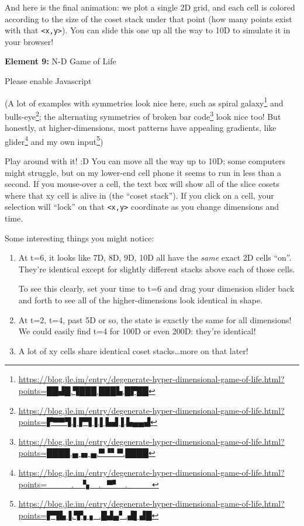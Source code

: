\documentclass[]{article}
\renewcommand{\href}[2]{#2\footnote{\url{#1}}}
\begin{document}
And here is the final animation: we plot a single 2D grid, and each cell is
colored according to the size of the coset stack under that point (how many
points exist with that \texttt{\textless{}x,y\textgreater{}}). You can slide
this one up all the way to 10D to simulate it in your browser!

\leavevmode\hypertarget{golFlat}{}%
\textbf{Element 9:} N-D Game of Life

\leavevmode\hypertarget{golFlatCont}{}%
Please enable Javascript

(A lot of examples with symmetries look nice here, such as
\href{https://blog.jle.im/entry/degenerate-hyper-dimensional-game-of-life.html?points=██▟█.▜███.███▙.█▛██}{spiral
galaxy} and
\href{https://blog.jle.im/entry/degenerate-hyper-dimensional-game-of-life.html?points=▛▀▀▜.▌▛▜▐.▌▙▟▐.▙▄▄▟}{bulls-eye};
the alternating symmetries of
\href{https://blog.jle.im/entry/degenerate-hyper-dimensional-game-of-life.html?points=████.▄▗▖▄.▀▝▘▀.████}{broken
bar code} look nice too! But honestly, at higher-dimensions, most patterns have
appealing gradients, like
\href{https://blog.jle.im/entry/degenerate-hyper-dimensional-game-of-life.html?points=____._▝▖_._▀▘_.____}{glider}
and
\href{https://blog.jle.im/entry/degenerate-hyper-dimensional-game-of-life.html?points=▛▜▙▐.▜▚▗_.█▟▄▘.▟▌▟█}{my
own input})

Play around with it! :D You can move all the way up to 10D; some computers might
struggle, but on my lower-end cell phone it seems to run in less than a second.
If you mouse-over a cell, the text box will show all of the slice cosets where
that xy cell is alive in (the ``coset stack''). If you click on a cell, your
selection will ``lock'' on that \texttt{\textless{}x,y\textgreater{}} coordinate
as you change dimensions and time.

Some interesting things you might notice:

\begin{enumerate}
\def\labelenumi{\arabic{enumi}.}
\item
  At t=6, it looks like 7D, 8D, 9D, 10D all have the \emph{same} exact 2D cells
  ``on''. They're identical except for slightly different stacks above each of
  those cells.

  To see this clearly, set your time to t=6 and drag your dimension slider back
  and forth to see all of the higher-dimensions look identical in shape.
\item
  At t=2, t=4, past 5D or so, the state is exactly the same for all dimensions!
  We could easily find t=4 for 100D or even 200D: they're identical!
\item
  A lot of xy cells share identical coset stacks\ldots more on that later!
\end{enumerate}
\end{document}
